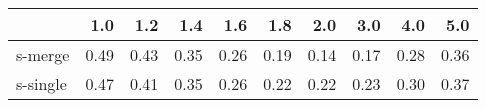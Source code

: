 \begin{tabular}{lrrrrrrrrr}
\toprule
{} &  1.0 &  1.2 &  1.4 &  1.6 &  1.8 &  2.0 &  3.0 &  4.0 &  5.0 \\
\midrule
s-merge  & 0.49 & 0.43 & 0.35 & 0.26 & 0.19 & 0.14 & 0.17 & 0.28 & 0.36 \\
s-single & 0.47 & 0.41 & 0.35 & 0.26 & 0.22 & 0.22 & 0.23 & 0.30 & 0.37 \\
\bottomrule
\end{tabular}
